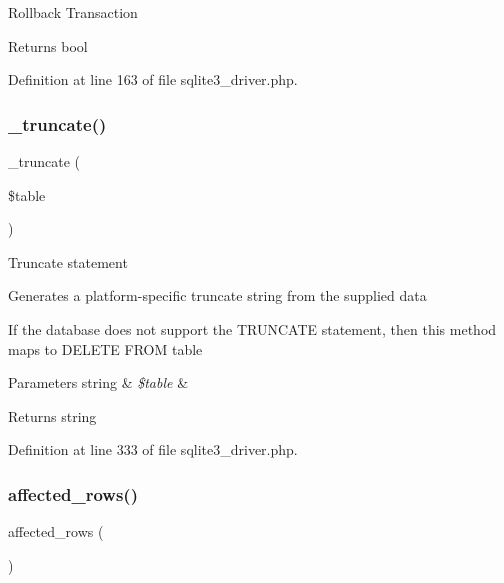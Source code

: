 Rollback Transaction

\begin{DoxyReturn}{Returns}
bool 
\end{DoxyReturn}


Definition at line 163 of file sqlite3\+\_\+driver.\+php.

\mbox{\label{class_c_i___d_b__sqlite3__driver_aa029600528fc1ce660a23ff4b4667f95}} 
\subsubsection{\texorpdfstring{\_truncate()}{\_truncate()}}
{\footnotesize\ttfamily \+\_\+truncate (\begin{DoxyParamCaption}\item[{}]{\$table }\end{DoxyParamCaption})\hspace{0.3cm}{\ttfamily [protected]}}

Truncate statement

Generates a platform-\/specific truncate string from the supplied data

If the database does not support the T\+R\+U\+N\+C\+A\+TE statement, then this method maps to \textquotesingle{}D\+E\+L\+E\+TE F\+R\+OM table\textquotesingle{}


\begin{DoxyParams}[1]{Parameters}
string & {\em \$table} & \\
\hline
\end{DoxyParams}
\begin{DoxyReturn}{Returns}
string 
\end{DoxyReturn}


Definition at line 333 of file sqlite3\+\_\+driver.\+php.

\mbox{\label{class_c_i___d_b__sqlite3__driver_a77248aaad33eb132c04cc4aa3f4bc8cb}} 
\subsubsection{\texorpdfstring{affected\_rows()}{affected\_rows()}}
{\footnotesize\ttfamily affected\+\_\+rows (\begin{DoxyParamCaption}{ }\end{DoxyParamCaption})}

